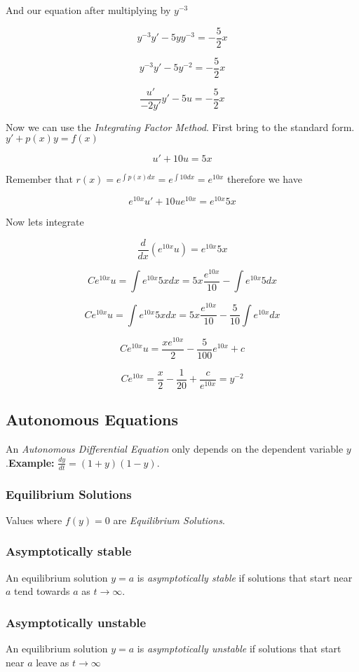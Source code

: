 And our equation after multiplying by \(y^{-3}\)

\[
 y^{-3}y' - 5yy^{-3} = -\frac{5}{2}x 
\]

\[
y^{-3}y' - 5y^{-2} = -\frac{5}{2}x 
\]

\[
\frac{u'}{-2y'}y' - 5u = -\frac{5}{2}x 
\]

Now we can use the \emph{Integrating Factor Method}. First bring to the standard form.
\(y' + p(x)y = f(x)\)

\[
  u' + 10u = 5x 
\]

Remember that \(r(x) = e^{\int p(x)dx} = e^{\int 10 dx} = e^{10x}\) therefore we have

\[
e^{10x}u' + 10ue^{10x} = e^{10x}5x
\]

Now lets integrate

\[
\frac{d}{dx} \left(e^{10x}u\right) = e^{10x}5x
\]

\[
Ce^{10x}u = \int e^{10x} 5x dx = 5x \frac{e^{10x}}{10} - \int e^{10x}5dx
\]

\[
Ce^{10x}u = \int e^{10x} 5x dx = 5x \frac{e^{10x}}{10} - \frac{5}{10}\int e^{10x}dx
\]

\[
Ce^{10x}u = \frac{xe^{10x}}{2} - \frac{5}{100} e^{10x} + c
\]

\[
    Ce^{10x} = \frac{x}{2} - \frac{1}{20} + \frac{c}{e^{10x}} = y^{-2}
\]


\subsection{Autonomous Equations}

An \emph{Autonomous Differential Equation} only depends on the dependent
variable \(y\).\textbf{Example: } \(\frac{dy}{dt} = (1 + y)(1 -y)\).

\subsubsection{Equilibrium Solutions}
Values where \(f(y) = 0\) are \emph{Equilibrium Solutions}.

\subsubsection*{Asymptotically stable}
An equilibrium solution \(y = a\) is \emph{asymptotically stable} if solutions
that start near \(a\) tend towards \(a\) as \(t \to \infty\).

\subsubsection*{Asymptotically unstable}
An equilibrium solution \(y = a\) is \emph{asymptotically unstable} if solutions
that start near \(a\) leave as \(t \to \infty\)


